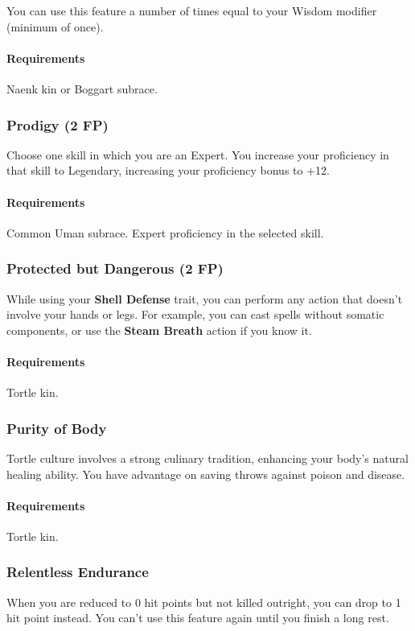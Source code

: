     You can use this feature a number of times equal to your Wisdom modifier (minimum of once).
    \paragraph{Requirements} Naenk kin or Boggart subrace.
\subsubsection{Prodigy (2 FP)} \label{feat::prodigy}
    Choose one skill in which you are an Expert.
    You increase your proficiency in that skill to Legendary, increasing your proficiency bonus to +12.
    \paragraph{Requirements} Common Uman subrace. Expert proficiency in the selected skill.
\subsubsection{Protected but Dangerous (2 FP)} \label{feat::protectedbutdangerous}
    While using your \textbf{Shell Defense} trait, you can perform any action that doesn't involve your hands or legs.
    For example, you can cast spells without somatic components, or use the \textbf{Steam Breath} action if you know it.
    \paragraph{Requirements} Tortle kin.
\subsubsection{Purity of Body} \label{feat::purityofbody}
    Tortle culture involves a strong culinary tradition, enhancing your body's natural healing ability.
    You have advantage on saving throws against poison and disease.
    \paragraph{Requirements} Tortle kin.
\subsubsection{Relentless Endurance} \label{feat::relentlessendurance}
    When you are reduced to 0 hit points but not killed outright, you can drop to 1 hit point instead.
    You can't use this feature again until you finish a long rest.
